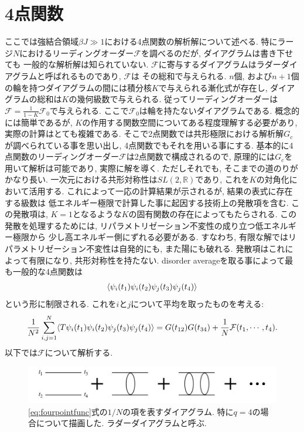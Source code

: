 \section{4点関数\label{sec:fourpointfunc}}
ここでは強結合領域$\beta J \gg 1$における4点関数の解析解について述べる. 
特にラージ$N$におけるリーディングオーダー$\mathcal{F}$を調べるのだが, ダイアグラムは書き下せても
一般的な解析解は知られていない. 
$\mathcal{F}$に寄与するダイアグラムはラダーダイアグラムと呼ばれるものであり, $\mathcal{F}$は
その総和で与えられる. 
$n$個, および$n+1$個の輪を持つダイアグラムの間には積分核$K$で与えられる漸化式が存在し, 
ダイアグラムの総和は$K$の幾何級数で与えられる. 
従ってリーディングオーダーは$\mathcal{F} = \frac{1}{1-K}\mathcal{F}_0$で与えられる. 
ここで$\mathcal{F}_0$は輪を持たないダイアグラムである. 
概念的には簡単であるが, $K$の作用する関数空間についてある程度理解する必要があり, 
実際の計算はとても複雑である. 
そこで2点関数では共形極限における解析解$G_c$が調べられている事を思い出し, 
4点関数でもそれを用いる事にする. 
基本的に4点関数のリーディングオーダー$\mathcal{F}$は2点関数で構成されるので, 
原理的には$G_c$を用いて解析は可能であり, 実際に解を導く. 
ただしそれでも, そこまでの道のりがかなり長い. 
一次元における共形対称性は$SL(2, \mathbb{R})$であり, これを$K$の対角化において活用する. 
これによって一応の計算結果が示されるが, 結果の表式に存在する級数は
低エネルギー極限で計算した事に起因する技術上の発散項を含む. 
この発散項は, $K = 1$となるような$K$の固有関数の存在によってもたらされる. 
この発散を処理するためには, リパラメトリゼーション不変性の成り立つ低エネルギー極限から
少し高エネルギー側にずれる必要がある. 
すなわち, 有限な解ではリパラメトリゼーション不変性は自発的にも, また陽にも破れる. 
発散項はこれによって有限になり, 共形対称性を持たない. 
disorder averageを取る事によって最も一般的な4点関数は
\begin{align}
	\langle \psi_i(t_1)\psi_i(t_2)\psi_j(t_3)\psi_j(t_4) \rangle
\end{align}
という形に制限される. 
これを$i$と$j$について平均を取ったものを考える:
\begin{align}
	\frac{1}{N^2}\sum_{i,j=1}^{N}\langle T\psi_i(t_1)\psi_i(t_2)\psi_j(t_3)\psi_j(t_4) \rangle
	= G(t_{12})G(t_{34}) + \frac{1}{N}\mathcal{F}(t_1, \cdots, t_4).
	\label{eq:fourpointfunc}
\end{align}
以下では$\mathcal{F}$について解析する. 

\begin{figure}[h]
	\centering
	\vspace{1cm}
	\includegraphics[width=13cm]{figures/ladderDiagram}
	\caption{\eqref{eq:fourpointfunc}式の$1/N$の項を表すダイアグラム. 
		特に$q=4$の場合について描画した. ラダーダイアグラムと呼ぶ. }
	\label{fig:ladderdiagram}
\end{figure}

